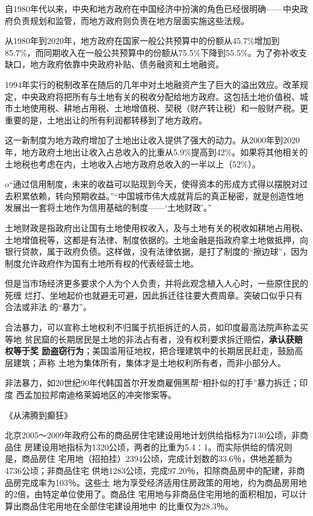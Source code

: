自1980年代以来，中央和地方政府在中国经济中扮演的角色已经很明确——中央政府负责规划和监管，而地方政府则负责在地方层面实施这些法规。

从1980年到2020年，地方政府在国家一般公共预算中的份额从45.7\%增加到85.7\%，而同期收入在一般公共预算中的份额从75.5\%下降到55.5\%。为了弥补收支缺口，地方政府依靠中央政府补贴、债务融资和土地融资。

1994年实行的税制改革在随后的几年中对土地融资产生了巨大的溢出效应。改革规定，中央政府将把所有与土地有关的税收分配给地方政府。这包括土地价值税、城市土地使用税、耕地占用税、土地增值税、契税（财产转让税）和一般财产税。更重要的是，土地出让的所有利润都转移到了地方政府。

这一新制度为地方政府增加了土地出让收入提供了强大的动力。从2000年到2020年，地方政府土地出让收入占总收入的比重从5.9\%提高到42\%。如果将其他相关的土地税也考虑在内，土地收入占地方政府总收入的一半以上（52\%）。

o“通过信用制度，未来的收益可以贴现到今天，使得资本的形成方式得以摆脱对过去积累依赖，转向预期收益。”“中国城市伟大成就背后的真正秘密，就是创造性地发展出一套将土地作为信用基础的制度——‘土地财政’。”


土地财政是指政府出让国有土地使用权收入，及与土地有关的税收如耕地占用税、土地增值税等，这都是有法律、制度依据的。土地金融是指政府拿土地做抵押，向银行贷款，属于政府负债。这样做，没有法律依据，是打了制度的“擦边球”，因为制度允许政府作为国有土地所有权的代表经营土地。


但是当市场经济更多要求个人为个人负责，并将此观念植入人心时，一些原住民的死缠
烂打、坐地起价也就避无可避，因此拆迁往往要大费周章。突破口似乎只有合法或非法
的“暴力”。

合法暴力，可以宣称土地权利不归属于抗拒拆迁的人员，如印度最高法院声称孟买等地
贫民窟的长期居民是土地的非法占有者，没有权利要求拆迁赔偿，\textbf{承认获赔权等于奖
励盗窃行为}；美国滥用征地权，把合理建筑中的长期居民赶走，鼓励高层建筑；声称
土地为集体所有，集体才是土地权利所有者，而非小部分人。

非法暴力，如20世纪90年代韩国首尔开发商雇佣黑帮“相扑似的打手”暴力拆迁；印度
西孟加拉邦南迪格莱姆地区的冲突惨案等。


《从沸腾到癫狂》

北京2005～2009年政府公布的商品房住宅建设用地计划供给指标为7130公顷，非商品住
房建设用地指标为1320公顷，两者的比重为5.4∶1。而实际供给的情况则是，商品房住
宅用地（招拍挂）2394公顷，完成计划数的33.6％，供地差额为4736公顷；非商品住宅
供地1283公顷，完成97.20％，扣除商品房中的配建，非商品房完成率为103％。这些土
地为享受经济适用住房政策的用地，约为商品房用地的2倍，由特定单位使用了。商品住
宅用地与非商品住宅用地的面积相加，可以计算出商品住宅用地在全部住宅建设用地中
的比重仅为28.3％。



